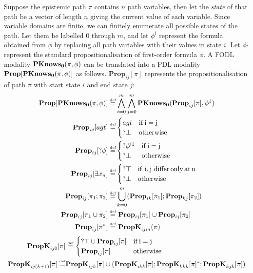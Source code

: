 Suppose the epistemic path $\pi$ contains $n$ path variables, then
let the \emph{state} of that path be a vector of length $n$ giving
the current value of each variable. Since variable domains are finite,
we can finitely enumerate all possible states of the path. Let them
be labelled $0$ through $m$, and let $\phi^{i}$ represent the formula
obtained from $\phi$ by replacing all path variables with their values
in state $i$. Let $\phi^{\downarrow}$ represent the standard propositionalisation
of first-order formula $\phi$. A FODL modality $\mathbf{PKnows_{0}}(\pi,\phi)$
can be translated into a PDL modality $\mathbf{Prop}[\mathbf{PKnows_{0}}(\pi,\phi)]$
as follows. $\mathbf{Prop}_{ij}[\pi]$ represents the propositionalisation
of path $\pi$ with start state $i$ and end state $j$:\begin{align*}
\mathbf{Prop}[\mathbf{PKnows_{0}}(\pi,\phi)]\stackrel{\mbox{\tiny def}}{=} & \bigwedge_{i=0}^{m}\bigwedge_{j=0}^{m}\mathbf{PKnows_{0}}(\mathbf{Prop}_{ij}[\pi],\phi^{\downarrow})\\
\mathbf{Prop}_{ij}[agt]\stackrel{\mbox{\tiny def}}{=} & \begin{cases}
agt & \mathrm{if\, i=j}\\
?\bot & \mathrm{otherwise}\end{cases}\\
\mathbf{Prop}_{ij}[?\phi]\stackrel{\mbox{\tiny def}}{=} & \begin{cases}
?\phi^{i\downarrow} & \mathrm{if\, i=j}\\
?\bot & \mathrm{otherwise}\end{cases}\\
\mathbf{Prop}_{ij}[\exists x_{n}]\stackrel{\mbox{\tiny def}}{=} & \begin{cases}
?\top & \mathrm{if\,\, i,j\,\, differ\, only\, at\, n}\\
?\bot & \mathrm{otherwise}\end{cases}\\
\mathbf{Prop}_{ij}[\pi_{1};\pi_{2}]\stackrel{\mbox{\tiny def}}{=} & \bigcup_{k=0}^{m}(\mathbf{Prop}_{ik}[\pi_{1}];\mathbf{Prop}_{kj}[\pi_{2}])\\
\mathbf{Prop}_{ij}[\pi_{1}\cup\pi_{2}]\stackrel{\mbox{\tiny def}}{=} & \,\,\mathbf{Prop}_{ij}[\pi_{1}]\cup\mathbf{Prop}_{ij}[\pi_{2}]\\
\mathbf{Prop}_{ij}[\pi^{*}]\stackrel{\mbox{\tiny def}}{=} & \,\,\mathbf{PropK}_{ijm}(\pi)\end{align*}
 \begin{align*}
\mathbf{PropK}_{ij0}[\pi] & \stackrel{\mbox{\tiny def}}{=}\begin{cases}
?\top\cup\mathbf{Prop}_{ij}[\pi] & \mathrm{if\, i=j}\\
\mathbf{Prop}_{ij}[\pi] & \mathrm{otherwise}\end{cases}\\
\mathbf{PropK}_{ij(k+1)}[\pi]\stackrel{\mbox{\tiny def}}{=} & \mathbf{PropK}_{ijk}[\pi]\cup(\mathbf{PropK}_{ikk}[\pi];\mathbf{PropK}_{kkk}[\pi]^{*};\mathbf{PropK}_{kjk}[\pi])\end{align*}


